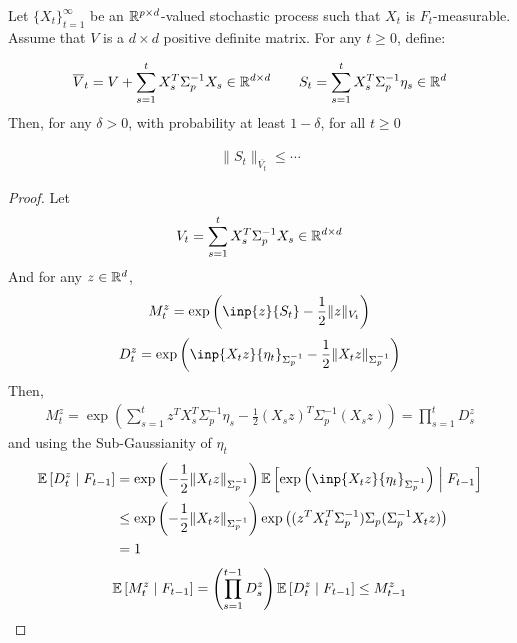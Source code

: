 \documentclass{article}
\begin{document}
{\begin{lemma}
Let $\{X_t\}_{t=1}^\infty$ be an $\mathbb{R}^{p\times d}$-valued stochastic process such that $X_t$ is $F_t$-measurable. Assume that $V$ is a $d\times d$ positive definite matrix. For any $t\geq 0$, define:

\begin{equation*}
    \overline{V}_t = V + \sum_{s=1}^t X_s^T \Sigma_p^{-1} X_s \in \mathbb{R}^{d\times d} \qquad S_t = \sum_{s=1}^t X_s^T\Sigma_p^{-1}\eta_s \in \mathbb{R}^{d}
\end{equation*}
Then, for any $\delta>0$, with probability at least $1-\delta$, for all $t\geq0$

\begin{align*}
    \|S_t\|_{\overline{V_t}} \leq \cdots
\end{align*}

\end{lemma}
\begin{proof}

Let 
\begin{equation*}
    V_t = \sum_{s=1}^t X_s^T \Sigma_p^{-1} X_s \in \mathbb{R}^{d\times d}
\end{equation*}
And for any $z\in\mathbb{R}^d$,
\begin{equation*}
    M_t^z = \exp{\left(\inp{z}{S_t} - \frac{1}{2}\|z\|_{V_t}\right)}
\end{equation*}
\begin{equation*}
    D_t^z = \exp{\left(\inp{X_t z}{\eta_t}_{\Sigma_p^{-1}} - \frac{1}{2}\|X_t z\|_{\Sigma_p^{-1}}\right)}
\end{equation*}
Then,
\begin{align*}
    M_t^z = \exp{\left(\sum_{s=1}^t z^T X_s^T \Sigma_p^{-1} \eta_s - \frac{1}{2} (X_s z)^T\Sigma_p^{-1}(X_s z) \right)} = \prod_{s=1}^{t} D_s^z
\end{align*}
and using the Sub-Gaussianity of $\eta_t$
\begin{align*}
    \expectedvalue\left[D_t^z \condbar F_{t-1}\right] &= \exp{\left(- \frac{1}{2}\|X_t z\|_{\Sigma_p^{-1}}\right)} \expectedvalue\left[\exp{\left(\inp{X_t z}{\eta_t}_{\Sigma_p^{-1}}\right)} \condbar F_{t-1}\right]  \\
    &\leq \exp{\left(- \frac{1}{2}\|X_t z\|_{\Sigma_p^{-1}}\right)}\exp{\left((z^T X_t^T \Sigma_p^{-1})\Sigma_p(\Sigma_p^{-1} X_t z)\right)}\\
    &= 1
\end{align*}
\begin{align*}
    \operatorname*{\mathbb{E}}\left[M_t^z \;\middle|\; F_{t-1}\right] = \left(\prod_{s=1}^{t-1} D_s^z\right) \operatorname*{\mathbb{E}}\left[D_t^z \;\middle|\; F_{t-1}\right] \leq M_{t-1}^z
\end{align*}


\end{proof}}
\end{document}
